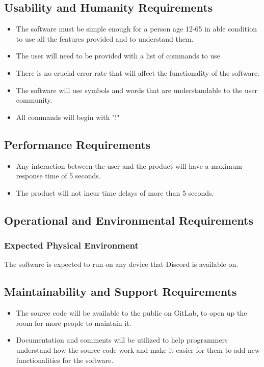 \documentclass[12pt, titlepage]{article}
\begin{document}
\subsection{Usability and Humanity Requirements}
\begin{itemize}
\item The software must be simple enough for a person age 12-65 in able condition to use all the features provided and to understand them. 
\color{blue}
\item The user will need to be provided with a list of commands to use
\color{black}
\item There is no crucial error rate that will affect the functionality of the software. 
\item The software will use symbols and words that are understandable to the user community. 
\color{blue}
\item All commands will begin with "!"
\end{itemize}

\subsection{Performance Requirements}
\begin{itemize}
\item Any interaction between the user and the product will have a maximum response time of 5 seconds. 
\item The product will not incur time delays of more than 5 seconds. 
\end{itemize}
\subsection{Operational and Environmental Requirements}
\subsubsection {Expected Physical Environment}
The software is expected to run on any device that Discord is available on.


\subsection{Maintainability and Support Requirements}
\begin{itemize}
\item The source code will be available to the public on GitLab, to open up the room for more people to maintain it.

\item Documentation and comments will be utilized to help programmers understand how the source code work and make it easier for them to add new functionalities for the software.
\end{itemize}
\end{document}
